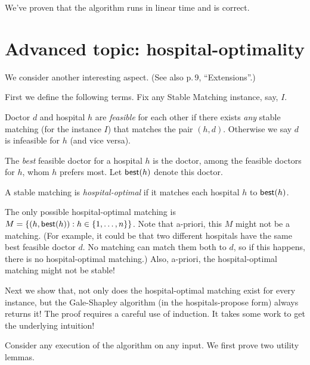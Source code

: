 \documentclass[11pt]{article}
\begin{document}
We've proven that the algorithm runs in linear time and is correct.

\continued

\section{Advanced topic: hospital-optimality}\label{matching: sec: hospital optimal}

We consider another interesting aspect.  (See also \KT p.\,9, ``Extensions''.)

First we define the following terms.
Fix any Stable Matching instance, say, $I$.  
\begin{mylist}[-]
  
\item Doctor $d$ and hospital $h$ are \emph{feasible} for each other
if there exists \emph{any} stable matching (for the instance $I$) that matches the pair $(h,d)$.
Otherwise we say $d$ is infeasible for $h$ (and vice versa).

\item The \emph{best} feasible doctor for a hospital $h$ is the doctor,
among the feasible doctors for $h$,
whom $h$ prefers most.
Let $\text{\sf best}(h)$ denote this doctor.

\item A stable matching is \emph{hospital-optimal}
  if it matches each hospital $h$ to $\text{\sf best}(h)$.
\end{mylist}

The only possible hospital-optimal matching is $M = \{(h, \text{\sf best}(h)) : h\in\{1,\ldots,n\}\}$.
Note that a-priori, this $M$ might not be a matching.
(For example, it could be that two different hospitals have the same best feasible doctor $d$.
No matching can match them both to $d$, so if this happens, there is no hospital-optimal matching.)
Also, a-priori, the hospital-optimal matching might not be stable!

Next we show that, not only does the hospital-optimal matching exist for every instance,
but the Gale-Shapley algorithm (in the hospitals-propose form) always returns it!
The proof requires a careful use of induction.
It takes some work to get the underlying intuition!

Consider any execution of the algorithm on any input.  We first prove two utility lemmas.  
\end{document}
